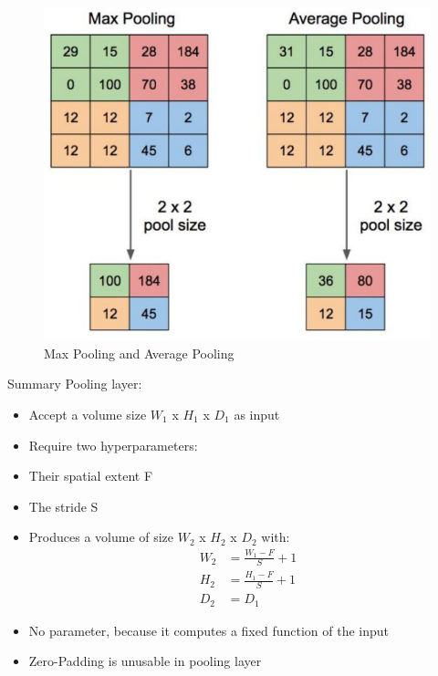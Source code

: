 \begin{center}
  \begin{figure}[H]
  \centering
  \includegraphics[width=1\columnwidth]{images/chap2/Pooling.png}
  \caption{Max Pooling and Average Pooling}
  \label{chap2:WSP}
  \end{figure}
\end{center}

Summary Pooling layer:
\begin{itemize}
	\item Accept a volume size $W_{1}$ x $H_{1}$ x $D_{1}$ as input
	\item Require two hyperparameters:
	\item Their spatial extent F 
	\item The stride S
	\item Produces a volume of size $W_{2}$ x $H_{2}$ x $D_{2}$ with:
	\begin{align*}
	W_{2} &= \frac{W_{1} - F }{S} + 1\\
	H_{2} &= \frac{H_{1} - F }{S} + 1\\
	D_{2} &= D_{1}
	\end{align*}
	\item No parameter, because it computes a fixed function of the input\\
	\item Zero-Padding is unusable in pooling layer
\end{itemize}



